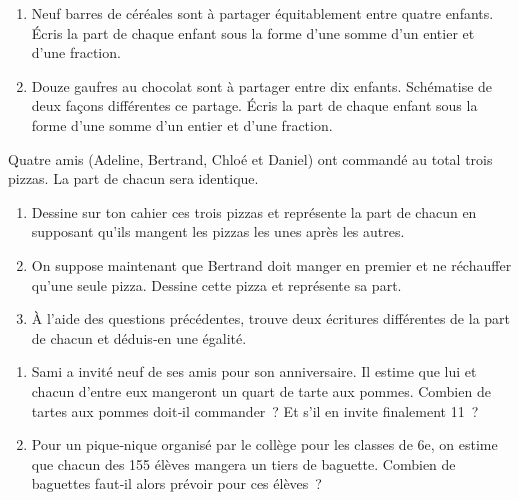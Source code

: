 \begin{activite}

\begin{partie}
\begin{enumerate}
 \item Neuf barres de céréales sont à partager équitablement entre quatre enfants. Écris la part de chaque enfant sous la forme d'une somme d'un entier et d'une fraction.
 \item Douze gaufres au chocolat sont à partager entre dix enfants. Schématise de deux façons différentes ce partage. Écris la part de chaque enfant sous la forme d'une somme d'un entier et d'une fraction.
 \end{enumerate}
\end{partie}

\begin{partie}
Quatre amis (Adeline, Bertrand, Chloé et Daniel) ont commandé au total trois pizzas. La part de chacun sera identique.
\begin{enumerate}
 \item Dessine sur ton cahier ces trois pizzas et représente la part de chacun en supposant qu'ils mangent les pizzas les unes après les autres.
 \item On suppose maintenant que Bertrand doit manger en premier et ne réchauffer qu'une seule pizza. Dessine cette pizza et représente sa part.
 \item À l'aide des questions précédentes, trouve deux écritures différentes de la part de chacun et déduis‑en une égalité.
 \end{enumerate}
\end{partie}

\begin{partie}
\begin{enumerate}
 \item Sami a invité neuf de ses amis pour son anniversaire. Il estime que lui et chacun d'entre eux mangeront un quart de tarte aux pommes. Combien de tartes aux pommes doit‑il commander ? Et s'il en invite finalement 11 ?
 \item Pour un pique‑nique organisé par le collège pour les classes de 6e, on estime que chacun des 155 élèves mangera un tiers de baguette. Combien de baguettes faut‑il alors prévoir pour ces élèves ? 
 \end{enumerate}
\end{partie}

\end{activite}


